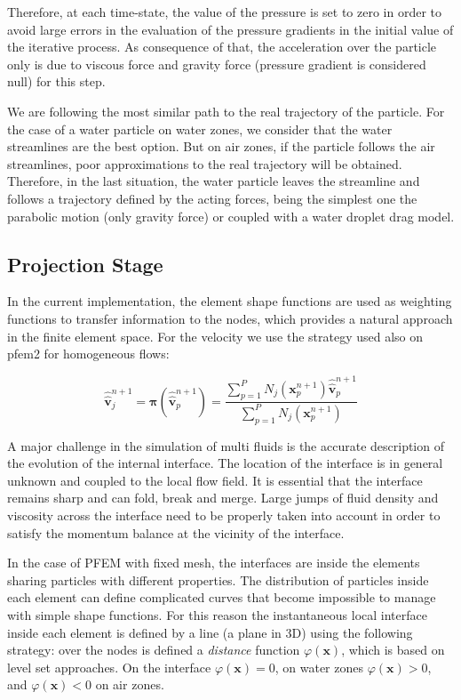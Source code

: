 \documentclass[a4paper,conference]{IEEEtran}
\newcommand{\vv}{\mathbf{v}}
\newcommand{\xx}{\mathbf{x}}
\begin{document}
    Therefore, at each time-state, the value of the pressure is set to zero in order to avoid large errors in the evaluation of the pressure gradients in the initial value of the iterative process. As consequence of that, the acceleration over the particle only is due to viscous force and gravity force (pressure gradient is considered null) for this step.
       
    We are following the most similar path to the real trajectory of the particle. For the case of a water particle on water zones, we consider that the water streamlines are the best option. But on air zones, if the particle follows the air streamlines, poor approximations to the real trajectory will be obtained. Therefore, in the last situation, the water particle leaves the streamline and follows a trajectory defined by the acting forces, being the simplest one the parabolic motion (only gravity force) or coupled with a water droplet drag model. 

\subsection{Projection Stage}
      
    In the current implementation, the element shape functions are used as weighting functions to transfer information to the nodes, which provides a natural approach in the finite element space. For the velocity we use the strategy used also on pfem2 for homogeneous flows:
    
    \begin{equation}
      \hat{\hat{\vv}}_j^{n+1} = \boldsymbol{\pi}(\hat{\hat{\vv}}_p^{n+1}) = \dfrac{\sum_{p=1}^P N_j(\xx_p^{n+1}) \hat{\hat{\vv}}_p^{n+1} }{\sum_{p=1}^P N_j(\xx_p^{n+1})}
    \end{equation}

    A major challenge in the simulation of multi fluids is the accurate description of the evolution of the internal interface. The location of the interface is in general unknown and coupled to the local flow field. It is essential that the interface remains sharp and can fold, break and merge. Large jumps of fluid density and viscosity across the interface need to be properly taken into account in order to satisfy the momentum balance at the vicinity of the interface.
    
    In the case of PFEM with fixed mesh, the interfaces are inside the elements sharing particles with different properties. The distribution of particles inside each element can define complicated curves that become impossible to manage with simple shape functions. For this reason the instantaneous local interface inside each element is defined by a line (a plane in 3D) using the following strategy: over the nodes is defined a \textit{distance} function $\varphi(\xx)$, which is based on level set approaches\cite{Osher01}. On the interface $\varphi(\xx)=0$, on water zones $\varphi(\xx)>0$, and $\varphi(\xx)<0$ on air zones. 
    
\end{document}
